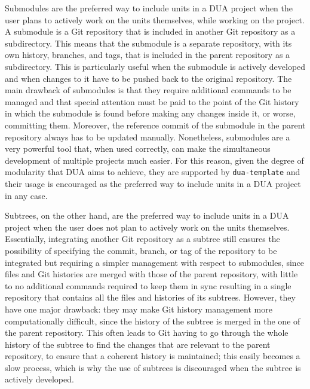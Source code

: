 Submodules are the preferred way to include units in a DUA project when the user plans to actively work on the units themselves, while working on the project. A submodule is a Git repository that is included in another Git repository as a subdirectory. This means that the submodule is a separate repository, with its own history, branches, and tags, that is included in the parent repository as a subdirectory. This is particularly useful when the submodule is actively developed and when changes to it have to be pushed back to the original repository. The main drawback of submodules is that they require additional commands to be managed and that special attention must be paid to the point of the Git history in which the submodule is found before making any changes inside it, or worse, committing them. Moreover, the reference commit of the submodule in the parent repository always has to be updated manually. Nonetheless, submodules are a very powerful tool that, when used correctly, can make the simultaneous development of multiple projects much easier. For this reason, given the degree of modularity that DUA aims to achieve, they are supported by \texttt{dua-template} and their usage is encouraged as the preferred way to include units in a DUA project in any case.

Subtrees, on the other hand, are the preferred way to include units in a DUA project when the user does not plan to actively work on the units themselves. Essentially, integrating another Git repository as a subtree still ensures the possibility of specifying the commit, branch, or tag of the repository to be integrated but requiring a simpler management with respect to submodules, since files and Git histories are merged with those of the parent repository, with little to no additional commands required to keep them in sync resulting in a single repository that contains all the files and histories of its subtrees. However, they have one major drawback: they may make Git history management more computationally difficult, since the history of the subtree is merged in the one of the parent repository. This often leads to Git having to go through the whole history of the subtree to find the changes that are relevant to the parent repository, to ensure that a coherent history is maintained; this easily becomes a slow process, which is why the use of subtrees is discouraged when the subtree is actively developed.

